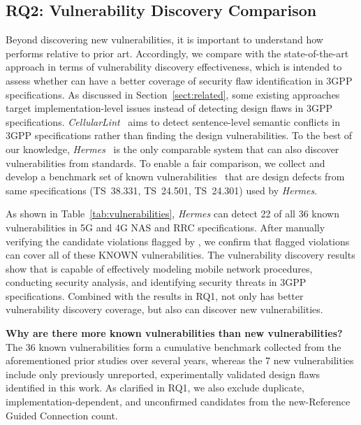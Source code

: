 \subsection{RQ2: Vulnerability Discovery Comparison}
Beyond discovering new vulnerabilities, it is important to understand how \lm performs relative to prior art. 
Accordingly, we compare \lm with the state-of-the-art approach in terms of vulnerability discovery effectiveness, which is intended to assess whether \lm can have a better coverage of security flaw identification in 3GPP specifications. As discussed in Section~\ref{sect:related}, some existing approaches~\cite{chen2021bookworm,chen2023sherlock,tan2025automated} target implementation-level issues instead of detecting design flaws in 3GPP specifications. \textit{CellularLint}~\cite{rahman2024cellularlint} aims to detect sentence-level semantic conflicts in 3GPP specifications rather than finding the design vulnerabilities.  
To the best of our knowledge, \textit{Hermes}~\cite{al2024hermes} is the only comparable system that can also discover vulnerabilities from standards. To enable a fair comparison, we collect and develop a benchmark set of known vulnerabilities~\cite{shaik2015practical, 6550445, kambourakis2011attacks, lee2009detection, leong2014unveiling, kim2019touching, van2015defeating, park2016white, chlosta2019lte, 8958725, michau2016not, hussain20195greasoner, borgaonkar2018new, 8894379, chlosta20215g, hussain2019privacy, al2024hermes, hussain2018lteinspector} that are design defects from same specifications (TS~38.331, TS~24.501, TS~24.301) used by \textit{Hermes}.



As shown in Table~\ref{tab:vulnerabilities}, \textit{Hermes} can detect 22 of all 36 known vulnerabilities in 5G and 4G NAS and RRC specifications. 
After manually verifying the candidate violations flagged by \lm, we confirm that flagged violations can cover all of these KNOWN vulnerabilities.
The vulnerability discovery results show that \lm is capable of effectively modeling mobile network procedures, conducting security analysis, and identifying security threats in 3GPP specifications. Combined with the results in RQ1, \lm not only has better vulnerability discovery coverage, but also can discover new vulnerabilities. 

\noindent \textbf{Why are there more known vulnerabilities than new vulnerabilities?}
The 36 known vulnerabilities form a cumulative benchmark collected from the aforementioned prior studies over several years, whereas the 7 new vulnerabilities include only previously unreported, experimentally validated design flaws identified in this work. As clarified in RQ1, we also exclude duplicate, implementation-dependent, and unconfirmed candidates from the new-Reference Guided Connection count. 


